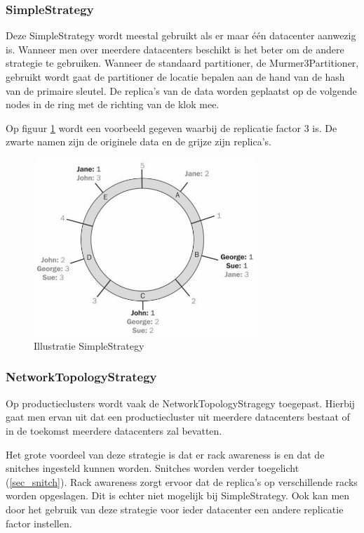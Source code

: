 \subsubsection{SimpleStrategy}
Deze SimpleStrategy wordt meestal gebruikt als er maar één datacenter aanwezig is.
Wanneer men over meerdere datacenters beschikt is het beter om de andere strategie te gebruiken.
Wanneer de standaard partitioner, de Murmer3Partitioner, gebruikt wordt gaat de partitioner de locatie bepalen aan de hand van de hash van de primaire sleutel.
De replica's van de data worden geplaatst op de volgende nodes in de ring met de richting van de klok mee.
	
Op figuur \ref{fig:simple_strategy} wordt een voorbeeld gegeven waarbij de replicatie factor 3 is.
De zwarte namen zijn de originele data en de grijze zijn replica's.
	
\begin{figure}[H]
	\centering
	\includegraphics[width=0.75\textwidth]{img/4_architectuur/SimpleStrategy}
	\caption{Illustratie SimpleStrategy \citep{strickland2014availability}}
	\label{fig:simple_strategy}
\end{figure}
	
	
\subsubsection{NetworkTopologyStrategy}
Op productieclusters wordt vaak de NetworkTopologyStragegy toegepast.
Hierbij gaat men ervan uit dat een productiecluster uit meerdere datacenters bestaat of in de toekomst meerdere datacenters zal bevatten.

Het grote voordeel van deze strategie is dat er rack awareness is en dat de snitches ingesteld kunnen worden.
Snitches worden verder toegelicht (\ref{sec_snitch}).
Rack awareness zorgt ervoor dat de replica's op verschillende racks worden opgeslagen.
Dit is echter niet mogelijk bij SimpleStrategy.
Ook kan men door het gebruik van deze strategie voor ieder datacenter een andere replicatie factor instellen.

